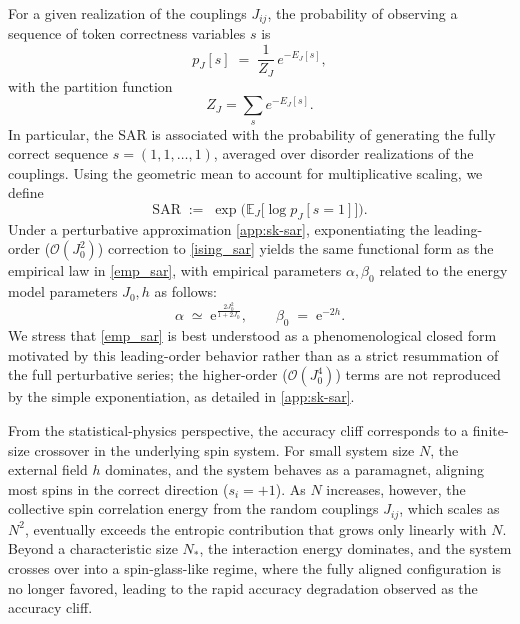\documentclass{article}
\theoremstyle{plain}
\begin{document}
For a given realization of the couplings $J_{ij}$, the probability of observing a sequence of token correctness variables  $s$ is
\begin{equation}
    p_J[s] \;=\; \frac{1}{Z_J} \, e^{-E_J[s]},
\end{equation}
with the partition function
\begin{equation}
    Z_J = \sum_{s} e^{-E_J[s]}.
\end{equation}
In particular, the SAR is associated with the probability of generating the fully correct sequence $s = (1,1,\ldots,1)$, averaged over disorder realizations of the couplings. Using the geometric mean to account for multiplicative scaling, we define
\begin{equation}\label{ising_sar}
    \mathrm{SAR} \;:=\; \exp\!\Big( \mathbb{E}_J \big[ \log p_J[s=1] \big] \Big).
\end{equation}
Under a perturbative approximation \cref{app:sk-sar}, exponentiating the leading-order ($\mathcal{O}(J_0^2)$) correction to \cref{ising_sar} yields the same functional form as the empirical law in \cref{emp_sar}, with empirical parameters $\alpha, \beta_0$ related to the energy model parameters $J_0, h$ as follows:
\begin{equation}
    \alpha \;\simeq\; \mathrm{e}^{\frac{2 J_0^2}{1 + 2 J_0}},
    \qquad \beta_0 \;=\; \mathrm{e}^{-2h}.
\end{equation}
We stress that \cref{emp_sar} is best understood as a phenomenological closed form motivated by this leading-order behavior rather than as a strict resummation of the full perturbative series; the higher-order ($\mathcal{O}(J_0^4)$) terms are not reproduced by the simple exponentiation, as detailed in \cref{app:sk-sar}.

From the statistical-physics perspective, the accuracy cliff corresponds to a finite-size crossover in the underlying spin system. For small system size $N$, the external field $h$ dominates, and the system behaves as a paramagnet, aligning most spins in the correct direction ($s_i = +1$). As $N$ increases, however, the collective spin correlation energy from the random couplings $J_{ij}$, which scales as $N^2$, eventually exceeds the entropic contribution that grows only linearly with $N$. Beyond a characteristic size $N_*$, the interaction energy dominates, and the system crosses over into a spin-glass-like regime, where the fully aligned configuration is no longer favored, leading to the rapid accuracy degradation observed as the accuracy cliff.
\end{document}

